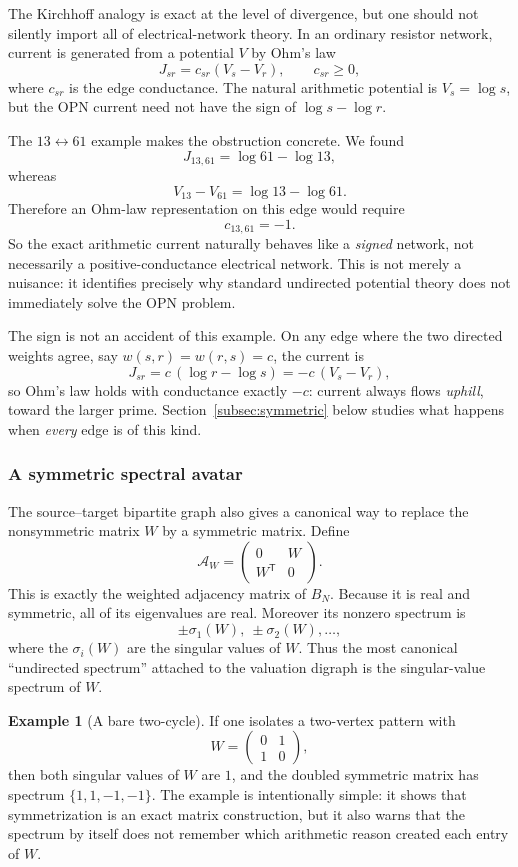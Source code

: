 \documentclass[11pt]{article}
\theoremstyle{definition}
\newtheorem{example}[theorem]{Example}
\theoremstyle{remark}
\begin{document}
The Kirchhoff analogy is exact at the level of divergence, but one should not
silently import all of electrical-network theory.  In an ordinary resistor
network, current is generated from a potential $V$ by Ohm's law
\[
J_{sr}=c_{sr}(V_s-V_r),\qquad c_{sr}\ge0,
\]
where $c_{sr}$ is the edge conductance.  The natural arithmetic potential is
$V_s=\log s$, but the OPN current need not have the sign of
$\log s-\log r$.

The $13\leftrightarrow61$ example makes the obstruction concrete.  We found
\[
J_{13,61}=\log61-\log13,
\]
whereas
\[
V_{13}-V_{61}=\log13-\log61.
\]
Therefore an Ohm-law representation on this edge would require
\[
c_{13,61}=-1.
\]
So the exact arithmetic current naturally behaves like a \emph{signed}
network, not necessarily a positive-conductance electrical network.  This is
not merely a nuisance: it identifies precisely why standard undirected
potential theory does not immediately solve the OPN problem.

The sign is not an accident of this example.  On any edge where the two
directed weights agree, say $w(s,r)=w(r,s)=c$, the current is
\[
J_{sr}=c\,(\log r-\log s)=-c\,(V_s-V_r),
\]
so Ohm's law holds with conductance exactly $-c$: current always flows
\emph{uphill}, toward the larger prime.  Section~\ref{subsec:symmetric} below
studies what happens when \emph{every} edge is of this kind.

\subsubsection{A symmetric spectral avatar}

The source--target bipartite graph also gives a canonical way to replace the
nonsymmetric matrix $W$ by a symmetric matrix.  Define
\[
\boxed{
\mathcal A_W=
\begin{pmatrix}
0&W\\
W^{\mathsf T}&0
\end{pmatrix}.
}
\]
This is exactly the weighted adjacency matrix of $B_N$.  Because it is real
and symmetric, all of its eigenvalues are real.  Moreover its nonzero
spectrum is
\[
\pm\sigma_1(W),\ \pm\sigma_2(W),\ldots,
\]
where the $\sigma_i(W)$ are the singular values of $W$.  Thus the most
canonical ``undirected spectrum'' attached to the valuation digraph is the
singular-value spectrum of $W$.

\begin{example}[A bare two-cycle]
If one isolates a two-vertex pattern with
\[
W=\begin{pmatrix}0&1\\1&0\end{pmatrix},
\]
then both singular values of $W$ are $1$, and the doubled symmetric matrix has
spectrum $\{1,1,-1,-1\}$.  The example is intentionally simple: it shows that
symmetrization is an exact matrix construction, but it also warns that the
spectrum by itself does not remember which arithmetic reason created each
entry of $W$.
\end{example}
\end{document}
